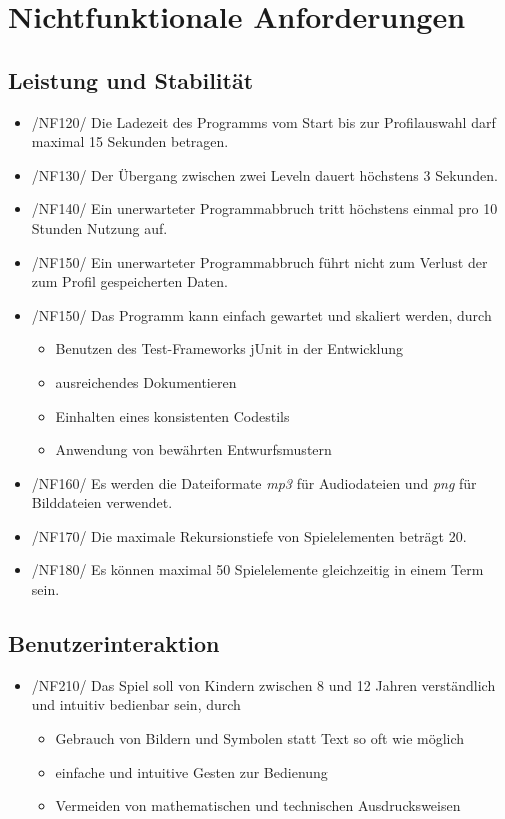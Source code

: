 \section{Nichtfunktionale Anforderungen}

\subsection{Leistung und Stabilität}

\begin{itemize}
\item /NF120/ Die Ladezeit des Programms vom Start bis zur Profilauswahl darf maximal 15 Sekunden betragen.
\item /NF130/ Der \"Ubergang zwischen zwei Leveln dauert höchstens 3 Sekunden.
\item /NF140/ Ein unerwarteter Programmabbruch tritt höchstens einmal pro 10 Stunden Nutzung auf.
\item /NF150/ Ein unerwarteter Programmabbruch führt nicht zum Verlust der zum Profil gespeicherten Daten.
\item /NF150/ Das Programm kann einfach gewartet und skaliert werden, durch
\begin{itemize}
\item Benutzen des Test-Frameworks jUnit in der Entwicklung
\item ausreichendes Dokumentieren
\item Einhalten eines konsistenten Codestils
\item Anwendung von bewährten Entwurfsmustern
\end{itemize}
\item /NF160/ Es werden die Dateiformate \textit{mp3} für Audiodateien und \textit{png} für Bilddateien verwendet.
\item /NF170/ Die maximale Rekursionstiefe von Spielelementen beträgt 20.
\item /NF180/ Es können maximal 50 Spielelemente gleichzeitig in einem Term sein.
\end{itemize}

\subsection{Benutzerinteraktion}
\begin{itemize}
\item /NF210/ Das Spiel soll von Kindern zwischen 8 und 12 Jahren verständlich und intuitiv bedienbar sein, durch
\begin{itemize}
\item Gebrauch von Bildern und Symbolen statt Text so oft wie möglich
\item einfache und intuitive Gesten zur Bedienung
\item Vermeiden von mathematischen und technischen Ausdrucksweisen
\end{itemize}
\end{itemize}

